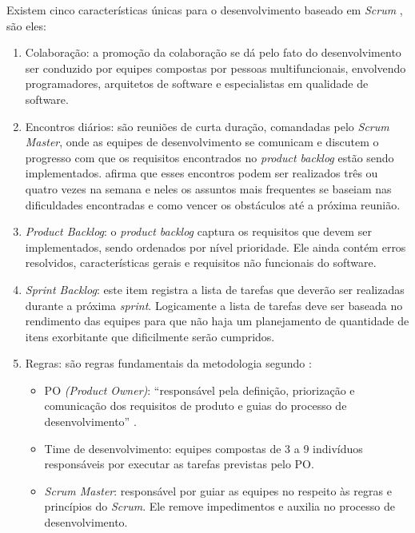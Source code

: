 Existem cinco características únicas para o desenvolvimento baseado em \textit{Scrum} , são eles:

\begin{enumerate}
 \item Colaboração: a promoção da colaboração se dá pelo fato do desenvolvimento ser conduzido por equipes compostas por pessoas multifuncionais, envolvendo programadores, arquitetos de software e especialistas em qualidade de software.
 
 \item Encontros diários: são reuniões de curta duração, comandadas pelo \textit{Scrum Master}, onde as equipes de desenvolvimento se comunicam e discutem o progresso com que os requisitos encontrados no \textit{product backlog} estão sendo implementados.  afirma que esses encontros podem ser realizados três ou quatro vezes na semana e neles os assuntos mais frequentes se baseiam nas dificuldades encontradas e como vencer os obstáculos até a próxima reunião.
 
 \item \textit{Product Backlog}: o \textit{product backlog} captura os requisitos que devem ser implementados, sendo ordenados por nível prioridade. Ele ainda contém erros resolvidos, características gerais e requisitos não funcionais do software.
 
 \item \textit{Sprint Backlog}: este item registra a lista de tarefas que deverão ser realizadas durante a próxima \textit{sprint}. Logicamente a lista de tarefas deve ser baseada no rendimento das equipes para que não haja um planejamento de quantidade de itens exorbitante que dificilmente serão cumpridos. 
 
 \item Regras: são regras fundamentais da metodologia segundo :
 \begin{itemize}
  \item PO \textit{(Product Owner)}: ``responsável pela definição, priorização e comunicação dos requisitos de produto e guias do processo de desenvolvimento'' \cite[~p. 3, tradução nossa]{matharu2015empirical}.
  
  \item Time de desenvolvimento: equipes compostas de 3 a 9 indivíduos responsáveis por executar as tarefas previstas pelo PO.
 
  \item \textit{Scrum Master}: responsável por guiar as equipes no respeito às regras e princípios do \textit{Scrum}. Ele remove impedimentos e auxilia no processo de desenvolvimento.
  
 \end{itemize}
 
\end{enumerate}


